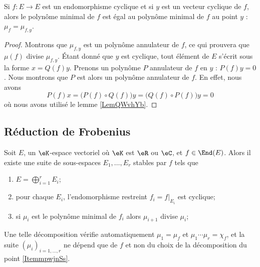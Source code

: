 \begin{lemma}   \label{LemAGZNNa}
    Si \( f\colon E\to E\) est un endomorphisme cyclique et si \( y\) est un vecteur cyclique de \( f\), alors le polynôme minimal de \( f\) est égal au polynôme minimal de \( f\) au point \( y\) : \( \mu_{f}=\mu_{f,y}\).
\end{lemma}

\begin{proof}
    Montrons que \( \mu_{f,y}\) est un polynôme annulateur de \( f\), ce qui prouvera que \( \mu(f)\) divise \( \mu_{f,y}\). Étant donné que \( y\) est cyclique, tout élément de \( E\) s'écrit sous la forme \( x=Q(f)y\). Prenons un polynôme \( P\) annulateur de \( f\) en \( y\) : \( P(f)y=0\). Nous montrons que \( P\) est alors un polynôme annulateur de \( f\). En effet, nous avons
    \begin{equation}
        P(f)x=\big( P(f)\circ Q(f) \big)y=\big( Q(f)\circ P(f) \big)y=0
    \end{equation}
    où nous avons utilisé le lemme \ref{LemQWvhYb}.
\end{proof}

\subsection{Réduction de Frobenius}

\begin{theorem}      
    Soit \( E\), un \( \eK\)-espace vectoriel où \( \eK\) est \( \eR\) ou \( \eC\), et \( f\in \End(E)\). Alors il existe une suite de sous-espaces \( E_1,\ldots, E_r\) stables par \( f\) tels que
    \begin{enumerate}
        \item   \label{ItemmpwjnSs}
            \( E=\bigoplus_{i=1}^rE_i\);
        \item
            pour chaque \( E_i\), l'endomorphisme restreint \( f_i=f|_{E_i}\) est cyclique;
        \item
            si \( \mu_i\) est le polynôme minimal de \( f_i\) alors \( \mu_{i+1}\) divise \( \mu_i\);
    \end{enumerate}
    Une telle décomposition vérifie automatiquement \( \mu_1=\mu_f\) et \( \mu_1\cdots \mu_r=\chi_f\), et la suite \( (\mu_i)_{i=1,\ldots, r}\) ne dépend que de \( f\) et non du choix de la décomposition du point \ref{ItemmpwjnSs}.
\end{theorem}

